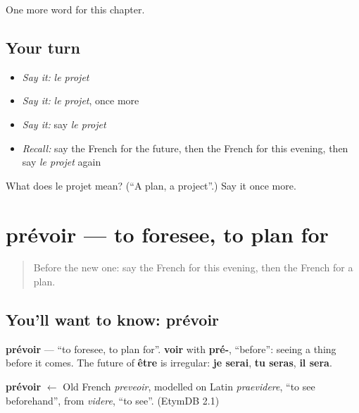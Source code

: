 \begin{grammarlens}[title={What you've built}]
One more word for this chapter.
\end{grammarlens}

\subsection*{Your turn}
\begin{itemize}
\raggedright
  \item \emph{Say it:} \emph{le projet}
  \item \emph{Say it:} \emph{le projet}, once more
  \item \emph{Say it:} say \emph{le projet}
  \item \emph{Recall:} say the French for the future, then the French for this evening, then say \emph{le projet} again
\end{itemize}

\begin{tcolorbox}[breakable,colback=teal!4,colframe=teal!35!black,title={Before you move on}]
What does le projet mean? (\textquotedblleft{}A plan, a project\textquotedblright{}.) Say it once more.
\end{tcolorbox}
\section[prévoir]{prévoir — to foresee, to plan for}

\label{lesson:FR-C141-prevoir}



\begin{quote}
Before the new one: say the French for this evening, then the French for a plan.
\end{quote}

\subsection*{You'll want to know: prévoir}
\textbf{prévoir} — \textquotedblleft{}to foresee, to plan for\textquotedblright{}. \textbf{voir} with \textbf{pré-}, \textquotedblleft{}before\textquotedblright{}: seeing a thing before it comes. The future of \textbf{être} is irregular: \textbf{je serai}, \textbf{tu seras}, \textbf{il sera}.

\begin{cousinweb}
\textbf{prévoir} $\leftarrow$ Old French \emph{preveoir}, modelled on Latin \emph{praevidere}, \textquotedblleft{}to see beforehand\textquotedblright{}, from \emph{videre}, \textquotedblleft{}to see\textquotedblright{}. (EtymDB 2.1)
\end{cousinweb}

